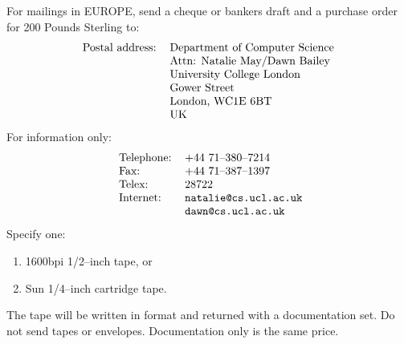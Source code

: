 For mailings in EUROPE, send a cheque or bankers draft and a purchase
order
for 200 Pounds Sterling to:
\[\begin{tabular}{ll}
Postal address:&        Department of Computer Science\\
&                       Attn: Natalie May/Dawn Bailey\\
&                       University College London\\
&                       Gower Street\\
&                       London, WC1E 6BT\\
&                       UK
\end{tabular}\]
For information only:
\[\begin{tabular}{ll}
\ Telephone:&           +44 71--380--7214\\
\ Fax:&                 +44 71--387--1397\\
\ Telex:&               28722\\
\ Internet:&            \verb"natalie@cs.ucl.ac.uk"\\
&                       \verb"dawn@cs.ucl.ac.uk"
\end{tabular}\]
Specify one:
\begin{enumerate}
\item   1600bpi 1/2--inch tape, or

\item   Sun 1/4--inch cartridge tape.
\end{enumerate}
The tape will be written in  format and returned with
a documentation set.
Do not send tapes or envelopes.
Documentation only is the same price.

